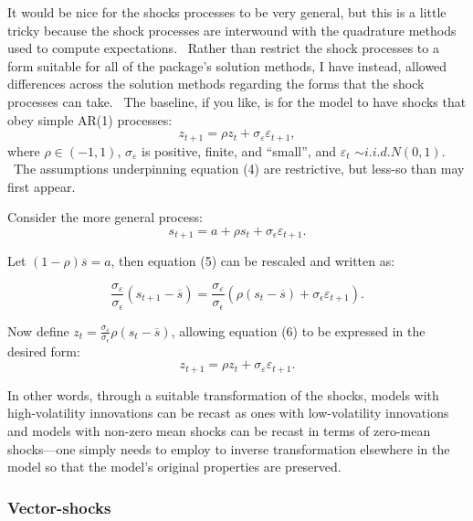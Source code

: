 \documentclass[notitlepage,11pt]{article}
\begin{document}
It would be nice for the shocks processes to be very general, but this is a
little tricky because the shock processes are interwound with the quadrature
methods used to compute expectations. \ Rather than restrict the shock
processes to a form suitable for all of the package's solution methods, I
have instead, allowed differences across the solution methods regarding the
forms that the shock processes can take. \ The baseline, if you like, is for
the model to have shocks that obey simple AR(1) processes:%
\begin{equation}
z_{t+1}=\rho z_{t}+\sigma _{\varepsilon }\varepsilon _{t+1},  \label{4}
\end{equation}%
where $\rho \in (-1,1)$, $\sigma _{\varepsilon }$ is positive, finite, and
\textquotedblleft small\textquotedblright , and $\varepsilon _{t}$ $\sim
i.i.d.N(0,1)$. \ The assumptions underpinning equation (4) are restrictive,
but less-so than may first appear.

Consider the more general process:%
\begin{equation}
s_{t+1}=a+\rho s_{t}+\sigma _{\epsilon }\varepsilon _{t+1}.  \label{5}
\end{equation}

Let $\left( 1-\rho \right) \overline{s}=a$, then equation (5) can be
rescaled and written as:

\begin{equation}
\frac{\sigma _{\varepsilon }}{\sigma _{\epsilon }}\left( s_{t+1}-\overline{s}%
\right) =\frac{\sigma _{\varepsilon }}{\sigma _{\epsilon }}\left( \rho
\left( s_{t}-\overline{s}\right) +\sigma _{\epsilon }\varepsilon
_{t+1}\right) .  \label{6}
\end{equation}

Now define $z_{t}=\frac{\sigma _{\varepsilon }}{\sigma _{\epsilon }}\rho
\left( s_{t}-\overline{s}\right) $, allowing equation (6) to be expressed in
the desired form:%
\begin{equation}
z_{t+1}=\rho z_{t}+\sigma _{\varepsilon }\varepsilon _{t+1}.  \label{7}
\end{equation}

In other words, through a suitable transformation of the shocks, models with
high-volatility innovations can be recast as ones with low-volatility
innovations and models with non-zero mean shocks can be recast in terms of
zero-mean shocks---one simply needs to employ to inverse transformation
elsewhere in the model so that the model's original properties are preserved.

\subsubsection{Vector-shocks}
\end{document}
